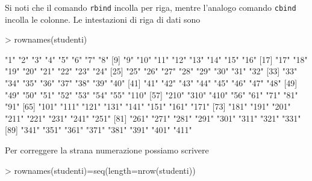\documentclass[onecolumn,11pt]{book}
\begin{document}
Si noti che il comando \texttt{rbind}  incolla per riga, mentre l'analogo comando \texttt{cbind}
 incolla le colonne.
Le intestazioni di riga di dati sono
\begin{Schunk}
\begin{Sinput}
> rownames(studenti)
\end{Sinput}
\begin{Soutput}
 [1] "1"   "2"   "3"   "4"   "5"   "6"   "7"   "8"  
 [9] "9"   "10"  "11"  "12"  "13"  "14"  "15"  "16" 
[17] "17"  "18"  "19"  "20"  "21"  "22"  "23"  "24" 
[25] "25"  "26"  "27"  "28"  "29"  "30"  "31"  "32" 
[33] "33"  "34"  "35"  "36"  "37"  "38"  "39"  "40" 
[41] "41"  "42"  "43"  "44"  "45"  "46"  "47"  "48" 
[49] "49"  "50"  "51"  "52"  "53"  "54"  "55"  "110"
[57] "210" "310" "410" "56"  "61"  "71"  "81"  "91" 
[65] "101" "111" "121" "131" "141" "151" "161" "171"
[73] "181" "191" "201" "211" "221" "231" "241" "251"
[81] "261" "271" "281" "291" "301" "311" "321" "331"
[89] "341" "351" "361" "371" "381" "391" "401" "411"
\end{Soutput}
\end{Schunk}
Per correggere la strana numerazione possiamo scrivere
\begin{Schunk}
\begin{Sinput}
> rownames(studenti)=seq(length=nrow(studenti))
\end{Sinput}
\end{Schunk}
\end{document}
